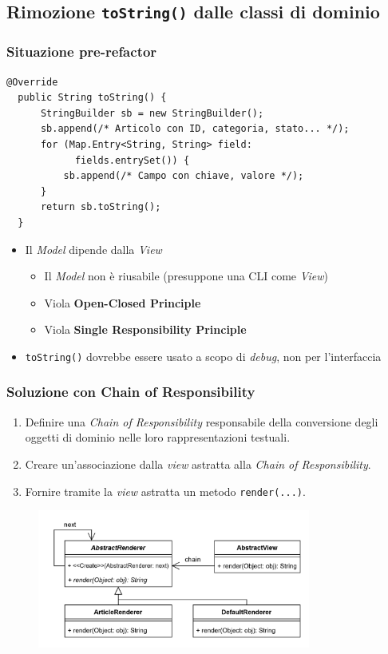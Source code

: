 \subsection{Rimozione \texttt{toString()} dalle classi di dominio}
\begin{frame}[fragile]
  \frametitle{Situazione pre-refactor}
  \begin{lstlisting}[autogobble, title={\texttt{toString()} di \texttt{Article.java}}]
  @Override
  public String toString() {
      StringBuilder sb = new StringBuilder();
      sb.append(/* Articolo con ID, categoria, stato... */);
      for (Map.Entry<String, String> field:
            fields.entrySet()) {
          sb.append(/* Campo con chiave, valore */);
      }
      return sb.toString();
  }
  \end{lstlisting}

  \begin{itemize}
    \item Il \emph{Model} dipende dalla \emph{View}
    \begin{itemize}
      \item Il \emph{Model} non è riusabile (presuppone una CLI come \emph{View})
      \item Viola \textbf{Open-Closed Principle}
      \item Viola \textbf{Single Responsibility Principle}
    \end{itemize}
    \item \texttt{toString()} dovrebbe essere usato a scopo di \emph{debug}, non per l'interfaccia
  \end{itemize}
\end{frame}

\begin{frame}
    \frametitle{Soluzione con Chain of Responsibility}
    \begin{enumerate}
        \item Definire una \emph{Chain of Responsibility} responsabile della conversione degli oggetti
        di dominio nelle loro rappresentazioni testuali.
        \item Creare un'associazione dalla \emph{view} astratta alla \emph{Chain of Responsibility}.
        \item Fornire tramite la \emph{view} astratta un metodo \texttt{render(...)}.
    \end{enumerate}

    \begin{figure}
        \includegraphics[width=0.8\textwidth]{img/chain.png}
    \end{figure}
\end{frame}

